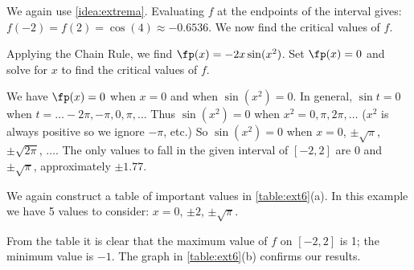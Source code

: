 
{We again use \autoref{idea:extrema}. Evaluating $f$ at the endpoints of the interval gives: $f(-2) = f(2) = \cos (4) \approx -0.6536.$ We now find the critical values of $f$.

Applying the Chain Rule, we find $\fp(x) = -2x\sin (x^2)$. Set $\fp(x) = 0$ and solve for $x$ to find the critical values of $f$. 

We have $\fp(x) = 0$ when $x = 0$ and when $\sin (x^2) = 0$. In general, $\sin t = 0$ when $t = \ldots -2\pi, -\pi, 0, \pi, \ldots$ Thus $\sin (x^2) = 0$ when $x^2 = 0, \pi, 2\pi, \ldots$ ($x^2$ is always positive so we ignore $-\pi$, etc.) So $\sin (x^2)=0$ when $x= 0$, $\pm \sqrt{\pi}$, $\pm\sqrt{2\pi}$, $\dotsc$. The only values to fall in the given interval of $[-2,2]$ are $0$ and $\pm\sqrt\pi$, approximately $\pm 1.77$.

We again construct a table of important values in \autoref{table:ext6}(a). In this example we have 5 values to consider: $x= 0$, $\pm 2$, $\pm\sqrt{\pi}$. 

From the table it is clear that the maximum value of $f$ on $[-2,2]$ is 1; the minimum value is $-1$. The graph in \autoref{table:ext6}(b) confirms our results.}

